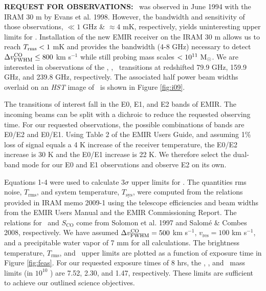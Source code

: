 \documentclass[11pt]{article}
\begin{document}

{\bf{REQUEST FOR OBSERVATIONS:}} \irs\ was observed in June 1994 with
the IRAM 30 m by Evans et al. 1998. However, the bandwidth and
sensitivity of those observations, $\ll 1$ GHz \& $\approx 4$ mK,
respectively, yields uninteresting upper limits for \mht. Installation
of the new EMIR receiver on the IRAM 30 m allows us to reach $T_{\mathrm{rms}} <
1$ mK and provides the bandwidth (4-8 GHz) necessary to detect $\Delta v^{\mathrm{CO}}_{\mathrm{FWHM}}
\leq 800$ km s$^{-1}$ while still probing mass scales $< 10^{11}
~\mathrm{M}_{\odot}$. We are interested in observations of the \cooz, \coto,
\cott\ transitions at redshifted 79.9 GHz, 159.9 GHz, and 239.8 GHz,
respectively. The associated half power beam widths overlaid on an
{\it{HST}} image of \irs\ is shown in Figure \ref{fig:i09}.

The transitions of interest fall in the E0, E1, and E2 bands of
EMIR. The incoming beams can be split with a dichroic to reduce the
requested observing time. For our requested observations, the possible
combinations of bands are E0/E2 and E0/E1. Using Table 2 of the EMIR
Users Guide, and assuming 1\% loss of signal equals a 4 K increase of
the receiver temperature, the E0/E2 increase is 30 K and the E0/E1
increase is 22 K. We therefore select the dual-band mode for our E0
and E1 observations and observe E2 on its own.

Equations 1-4 were used to calculate $3\sigma$ upper limits for
\mht. The quantities rms noise, $T_{\mathrm{rms}}$, and system
temperature, $T_{\mathrm{sys}}$, were computed from the relations
provided in IRAM memo 2009-1 using the telescope efficiencies and beam
widths from the EMIR Users Manual and the EMIR Commissioning
Report. The relations for \lcp\ and $S_{\mathrm{CO}}$ come from
Solomon et al. 1997 and Salom\'e \& Combes 2008, respectively. We have
assumed $\Delta v^{\mathrm{CO}}_{\mathrm{FWHM}} = 500$ km s$^{-1}$, $v_{\mathrm{res}} = 100$ km
s$^{-1}$, and a precipitable water vapor of 7 mm for all
calculations. The brightness temperature, $T_{\mathrm{rms}}$, and
\mht\ upper limits are plotted as a function of exposure time in
Figure \ref{fig:feas}. For our requested exposure times of 8 hrs, the
\cooz, \coto, and \cott\ mass limits (in $10^{10}$ \msol) are 7.52,
2.30, and 1.47, respectively. These limits are sufficient to achieve
our outlined science objectives.
\end{document}

